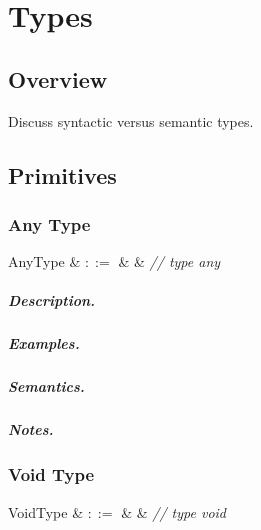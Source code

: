 \chapter{Types}
\section{Overview}
Discuss syntactic versus semantic types.
\section{Primitives}


\subsection{Any Type}

\begin{syntax}
  AnyType & $::=$ &  & {\em // type any}\\
\end{syntax}

\paragraph{Description.}

\paragraph{Examples.}

\paragraph{Semantics.}

\paragraph{Notes.} 


\subsection{Void Type}

\begin{syntax}
   VoidType & $::=$ &  & {\em // type void}\\
\end{syntax}

